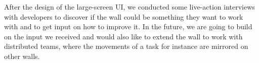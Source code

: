 \documentclass{sigchi}
\begin{document}
After the design of the large-screen UI, we conducted some live-action interviews with developers to discover if the wall could be something they want to work with and to get input on how to improve it.
In the future, we are going to build on the input we received and would also like to extend the wall to work with distributed teams, where the movements  of a task for instance are mirrored on other walls.


\balance{}



\end{document}
